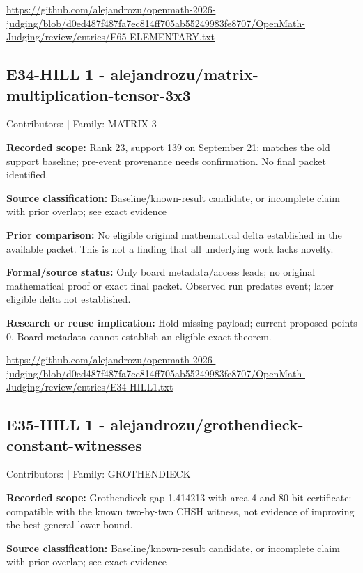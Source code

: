 \documentclass[11pt,a4paper]{article}
\begin{document}
{\small \url{https://github.com/alejandrozu/openmath-2026-judging/blob/d0ed487f487fa7ec814ff705ab55249983fe8707/OpenMath-Judging/review/entries/E65-ELEMENTARY.txt}\par}

\begin{samepage}
\subsection{E34-HILL 1  -  alejandrozu/matrix-multiplication-tensor-3x3}
{\small Contributors:  | Family: MATRIX-3\par}

\textbf{Recorded scope:} Rank 23, support 139 on September 21: matches the old support baseline; pre-event provenance needs confirmation. No final packet identified.

\end{samepage}
\textbf{Source classification:} Baseline/known-result candidate, or incomplete claim with prior overlap; see exact evidence

\textbf{Prior comparison:} No eligible original mathematical delta established in the available packet. This is not a finding that all underlying work lacks novelty.

\textbf{Formal/source status:} Only board metadata/access leads; no original mathematical proof or exact final packet. Observed run predates event; later eligible delta not established.

\textbf{Research or reuse implication:} Hold missing payload; current proposed points 0. Board metadata cannot establish an eligible exact theorem.

{\small \url{https://github.com/alejandrozu/openmath-2026-judging/blob/d0ed487f487fa7ec814ff705ab55249983fe8707/OpenMath-Judging/review/entries/E34-HILL1.txt}\par}

\begin{samepage}
\subsection{E35-HILL 1  -  alejandrozu/grothendieck-constant-witnesses}
{\small Contributors:  | Family: GROTHENDIECK\par}

\textbf{Recorded scope:} Grothendieck gap 1.414213 with area 4 and 80-bit certificate: compatible with the known two-by-two CHSH witness, not evidence of improving the best general lower bound.

\end{samepage}
\textbf{Source classification:} Baseline/known-result candidate, or incomplete claim with prior overlap; see exact evidence
\end{document}
